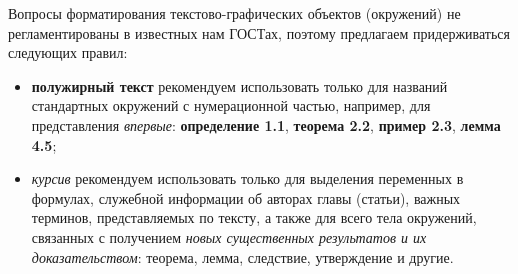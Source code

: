 Вопросы форматирования текстово-графических объектов (окружений) не регламентированы в известных нам ГОСТах, поэтому предлагаем придерживаться следующих правил:

\begin{itemize}
	\item \textbf{полужирный текст} рекомендуем использовать только для названий стандартных окружений с нумерационной частью, например, для представления \textit{впервые}: \textbf{определение 1.1}, \textbf{теорема 2.2}, \textbf{пример 2.3}, \textbf{лемма 4.5};
	
	\item \textit{курсив} рекомендуем использовать только для выделения переменных в формулах, служебной информации об авторах главы (статьи), важных терминов, представляемых по тексту, а также для всего тела окружений, связанных с получением \textit{новых существенных результатов и их доказательством}: теорема, лемма, следствие, утверждение и другие.
\end{itemize}

